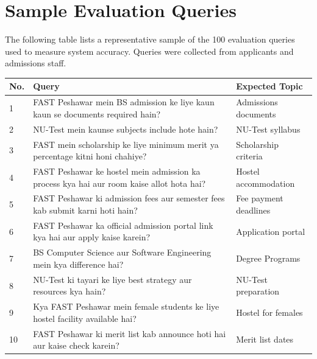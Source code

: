 \documentclass[12pt,a4paper]{report}
\begin{document}
\section{Sample Evaluation Queries}
\label{app:queries}

The following table lists a representative sample of the 100 evaluation queries
used to measure system accuracy. Queries were collected from applicants and
admissions staff.

\begin{longtable}{p{1cm} p{8cm} p{4cm}}
  \toprule
  \textbf{No.} & \textbf{Query} & \textbf{Expected Topic} \\
  \midrule
  \endhead
  1  & FAST Peshawar mein BS admission ke liye kaun kaun se documents required hain? & Admissions documents \\
  2  & NU-Test mein kaunse subjects include hote hain? & NU-Test syllabus \\
  3  & FAST mein scholarship ke liye minimum merit ya percentage kitni honi chahiye? & Scholarship criteria \\
  4  & FAST Peshawar ke hostel mein admission ka process kya hai aur room kaise allot hota hai? & Hostel accommodation \\
  5  & FAST Peshawar ki admission fees aur semester fees kab submit karni hoti hain? & Fee payment deadlines \\
  6  & FAST Peshawar ka official admission portal link kya hai aur apply kaise karein? & Application portal \\
  7  & BS Computer Science aur Software Engineering mein kya difference hai? & Degree Programs \\
  8  & NU-Test ki tayari ke liye best strategy aur resources kya hain? & NU-Test preparation \\
  9  & Kya FAST Peshawar mein female students ke liye hostel facility available hai? & Hostel for females \\
  10 &FAST Peshawar ki merit list kab announce hoti hai aur kaise check karein? & Merit list dates \\
  \bottomrule
\end{longtable}
\end{document}
